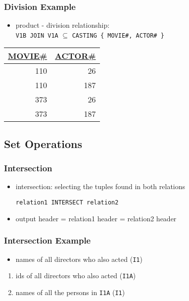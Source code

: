 \documentclass[dvipsnames]{beamer}
\theoremstyle{plain}
\begin{document}
\begin{frame}[fragile]
  \frametitle{Division Example}

  \begin{itemize}
    \item product - division relationship:\\
      \lstinline!V1B JOIN V1A! $\subseteq$
      \lstinline!CASTING { MOVIE#, ACTOR# }!
  \end{itemize}

  \begin{tiny}
  \begin{table}
    \begin{tabular}{|r|r|}\hline
\underline{MOVIE\#} & \underline{ACTOR\#}\\[2pt]\hline\hline
                110 &                  26\\\hline
                110 &                 187\\\hline
                373 &                  26\\\hline
                373 &                 187\\\hline
    \end{tabular}
  \end{table}
  \end{tiny}
\end{frame}

\subsection{Set Operations}

\begin{frame}[fragile]
  \frametitle{Intersection}

  \begin{itemize}
    \item \alert{intersection}: selecting the tuples found in both relations
    \begin{lstlisting}
relation1 INTERSECT relation2
    \end{lstlisting}

    \medskip
    \item output header = relation1 header = relation2 header
  \end{itemize}
\end{frame}

\begin{frame}
  \frametitle{Intersection Example}

  \begin{itemize}
    \item names of all directors who also acted (\texttt{I1})
  \end{itemize}

  \pause
  \begin{enumerate}
    \item ids of all directors who also acted (\texttt{I1A})

    \pause
    \item names of all the persons in \texttt{I1A} (\texttt{I1})
  \end{enumerate}
\end{frame}
\end{document}
